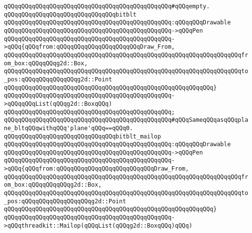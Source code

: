 \verb|qQQqqQQqqQQqqQQqqQQqqQQqqQQqqQQqqQQqqQQqqQQqqQQq#qQQqempty.|\newline
\newline
\verb|qQQqqQQqqQQqqQQqqQQqqQQqqQQqqQQqbitblt|\newline
\verb|qQQqqQQqqQQqqQQqqQQqqQQqqQQqqQQqqQQqqQQqqQQqqQQq:qQQqqQQqDrawable|\newline
\verb|qQQqqQQqqQQqqQQqqQQqqQQqqQQqqQQqqQQqqQQqqQQqqQQq->qQQqPen|\newline
\verb|qQQqqQQqqQQqqQQqqQQqqQQqqQQqqQQqqQQqqQQqqQQqqQQq->qQQq{qQQqfrom:qQQqqQQqqQQqqQQqqQQqqQQqDraw_From,|\newline
\verb|qQQqqQQqqQQqqQQqqQQqqQQqqQQqqQQqqQQqqQQqqQQqqQQqqQQqqQQqqQQqqQQqqQQqfrom_box:qQQqqQQqg2d::Box,|\newline
\verb|qQQqqQQqqQQqqQQqqQQqqQQqqQQqqQQqqQQqqQQqqQQqqQQqqQQqqQQqqQQqqQQqqQQqto_pos:qQQqqQQqqQQqqQQqg2d::Point|\newline
\verb|qQQqqQQqqQQqqQQqqQQqqQQqqQQqqQQqqQQqqQQqqQQqqQQqqQQqqQQqqQQq}|\newline
\verb|qQQqqQQqqQQqqQQqqQQqqQQqqQQqqQQqqQQqqQQqqQQqqQQq->qQQqqQQqList(qQQqg2d::BoxqQQq)|\newline
\verb|qQQqqQQqqQQqqQQqqQQqqQQqqQQqqQQqqQQqqQQqqQQqqQQq;|\newline
\verb|qQQqqQQqqQQqqQQqqQQqqQQqqQQqqQQqqQQqqQQqqQQqqQQq#qQQqSameqQQqasqQQqplane_bltqQQqwithqQQq'plane'qQQq==qQQq0.|\newline
\newline
\verb|qQQqqQQqqQQqqQQqqQQqqQQqqQQqqQQqbitblt_mailop|\newline
\verb|qQQqqQQqqQQqqQQqqQQqqQQqqQQqqQQqqQQqqQQqqQQqqQQq:qQQqqQQqDrawable|\newline
\verb|qQQqqQQqqQQqqQQqqQQqqQQqqQQqqQQqqQQqqQQqqQQqqQQq->qQQqPen|\newline
\verb|qQQqqQQqqQQqqQQqqQQqqQQqqQQqqQQqqQQqqQQqqQQqqQQq->qQQq{qQQqfrom:qQQqqQQqqQQqqQQqqQQqqQQqqQQqDraw_From,|\newline
\verb|qQQqqQQqqQQqqQQqqQQqqQQqqQQqqQQqqQQqqQQqqQQqqQQqqQQqqQQqqQQqqQQqqQQqfrom_box:qQQqqQQqqQQqg2d::Box,|\newline
\verb|qQQqqQQqqQQqqQQqqQQqqQQqqQQqqQQqqQQqqQQqqQQqqQQqqQQqqQQqqQQqqQQqqQQqto_pos:qQQqqQQqqQQqqQQqqQQqg2d::Point|\newline
\verb|qQQqqQQqqQQqqQQqqQQqqQQqqQQqqQQqqQQqqQQqqQQqqQQqqQQqqQQqqQQq}|\newline
\verb|qQQqqQQqqQQqqQQqqQQqqQQqqQQqqQQqqQQqqQQqqQQqqQQq->qQQqthreadkit::Mailop(qQQqList(qQQqg2d::BoxqQQq)qQQq)|\newline
